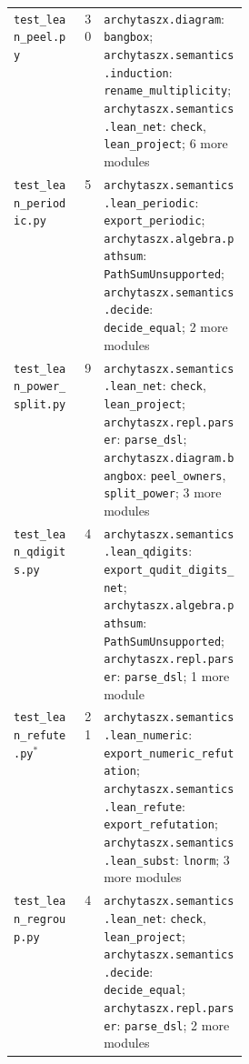 \begin{xltabular}{\linewidth}{@{}>{\raggedright\arraybackslash}p{0.3\linewidth}r>{\raggedright\arraybackslash}X@{}}
\texttt{test\_\allowbreak{}lean\_\allowbreak{}peel.py} & 30 & \texttt{archytaszx.\allowbreak{}diagram}: \texttt{bangbox}; \texttt{archytaszx.\allowbreak{}semantics.\allowbreak{}induction}: \texttt{rename\_\allowbreak{}multiplicity}; \texttt{archytaszx.\allowbreak{}semantics.\allowbreak{}lean\_\allowbreak{}net}: \texttt{check}, \texttt{lean\_\allowbreak{}project}; 6 more modules \\
\texttt{test\_\allowbreak{}lean\_\allowbreak{}periodic.py} & 5 & \texttt{archytaszx.\allowbreak{}semantics.\allowbreak{}lean\_\allowbreak{}periodic}: \texttt{export\_\allowbreak{}periodic}; \texttt{archytaszx.\allowbreak{}algebra.\allowbreak{}pathsum}: \texttt{PathSumUnsupported}; \texttt{archytaszx.\allowbreak{}semantics.\allowbreak{}decide}: \texttt{decide\_\allowbreak{}equal}; 2 more modules \\
\texttt{test\_\allowbreak{}lean\_\allowbreak{}power\_\allowbreak{}split.py} & 9 & \texttt{archytaszx.\allowbreak{}semantics.\allowbreak{}lean\_\allowbreak{}net}: \texttt{check}, \texttt{lean\_\allowbreak{}project}; \texttt{archytaszx.\allowbreak{}repl.\allowbreak{}parser}: \texttt{parse\_\allowbreak{}dsl}; \texttt{archytaszx.\allowbreak{}diagram.\allowbreak{}bangbox}: \texttt{peel\_\allowbreak{}owners}, \texttt{split\_\allowbreak{}power}; 3 more modules \\
\texttt{test\_\allowbreak{}lean\_\allowbreak{}qdigits.py} & 4 & \texttt{archytaszx.\allowbreak{}semantics.\allowbreak{}lean\_\allowbreak{}qdigits}: \texttt{export\_\allowbreak{}qudit\_\allowbreak{}digits\_\allowbreak{}net}; \texttt{archytaszx.\allowbreak{}algebra.\allowbreak{}pathsum}: \texttt{PathSumUnsupported}; \texttt{archytaszx.\allowbreak{}repl.\allowbreak{}parser}: \texttt{parse\_\allowbreak{}dsl}; 1 more module \\
\texttt{test\_\allowbreak{}lean\_\allowbreak{}refute.py}$^{\ast}$ & 21 & \texttt{archytaszx.\allowbreak{}semantics.\allowbreak{}lean\_\allowbreak{}numeric}: \texttt{export\_\allowbreak{}numeric\_\allowbreak{}refutation}; \texttt{archytaszx.\allowbreak{}semantics.\allowbreak{}lean\_\allowbreak{}refute}: \texttt{export\_\allowbreak{}refutation}; \texttt{archytaszx.\allowbreak{}semantics.\allowbreak{}lean\_\allowbreak{}subst}: \texttt{lnorm}; 3 more modules \\
\texttt{test\_\allowbreak{}lean\_\allowbreak{}regroup.py} & 4 & \texttt{archytaszx.\allowbreak{}semantics.\allowbreak{}lean\_\allowbreak{}net}: \texttt{check}, \texttt{lean\_\allowbreak{}project}; \texttt{archytaszx.\allowbreak{}semantics.\allowbreak{}decide}: \texttt{decide\_\allowbreak{}equal}; \texttt{archytaszx.\allowbreak{}repl.\allowbreak{}parser}: \texttt{parse\_\allowbreak{}dsl}; 2 more modules \\

\end{xltabular}
